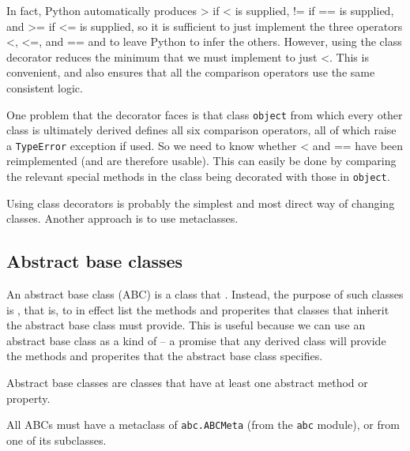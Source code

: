 In fact, Python automatically produces > if < is supplied, != if == is supplied, and >= if <= is supplied, so it is sufficient to just implement the three operators <, <=, and == and to leave Python to infer the others.
However, using the class decorator reduces the minimum that we must implement to just <.
This is convenient, and also ensures that all the comparison operators use the same consistent logic.


One problem that the decorator faces is that class \verb|object| from which every other class is ultimately derived defines all six comparison operators, all of which raise a \verb|TypeError| exception if used.
So we need to know whether < and == have been reimplemented (and are therefore usable).
This can easily be done by comparing the relevant special methods in the class being decorated with those in \verb|object|.



\begin{tcolorbox}
  Using class decorators is probably the simplest and most direct way of changing classes. Another approach is to use metaclasses.
\end{tcolorbox}



\subsection{Abstract base classes}

An abstract base class (ABC) is a class that .
Instead, the purpose of such classes is , that is, to in effect list the methods and properites that classes that inherit the abstract base class must provide.
This is useful because we can use an abstract base class as a kind of  -- a promise that any derived class will provide the methods and properites that the abstract base class specifies.


\begin{tcolorbox}
  Abstract base classes are classes that have at least one abstract method or property.
\end{tcolorbox}

\begin{tcolorbox}
  All ABCs must have a metaclass of \verb|abc.ABCMeta| (from the \verb|abc| module), or from one of its subclasses.
\end{tcolorbox}





